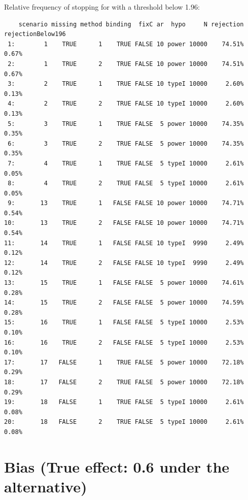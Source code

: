 \documentclass[12pt]{article}
\begin{document}
Relative frequency of stopping for with a threshold below 1.96:
\begin{verbatim}
    scenario missing method binding  fixC ar  hypo     N rejection rejectionBelow196
 1:        1    TRUE      1    TRUE FALSE 10 power 10000    74.51%             0.67%
 2:        1    TRUE      2    TRUE FALSE 10 power 10000    74.51%             0.67%
 3:        2    TRUE      1    TRUE FALSE 10 typeI 10000     2.60%             0.13%
 4:        2    TRUE      2    TRUE FALSE 10 typeI 10000     2.60%             0.13%
 5:        3    TRUE      1    TRUE FALSE  5 power 10000    74.35%             0.35%
 6:        3    TRUE      2    TRUE FALSE  5 power 10000    74.35%             0.35%
 7:        4    TRUE      1    TRUE FALSE  5 typeI 10000     2.61%             0.05%
 8:        4    TRUE      2    TRUE FALSE  5 typeI 10000     2.61%             0.05%
 9:       13    TRUE      1   FALSE FALSE 10 power 10000    74.71%             0.54%
10:       13    TRUE      2   FALSE FALSE 10 power 10000    74.71%             0.54%
11:       14    TRUE      1   FALSE FALSE 10 typeI  9990     2.49%             0.12%
12:       14    TRUE      2   FALSE FALSE 10 typeI  9990     2.49%             0.12%
13:       15    TRUE      1   FALSE FALSE  5 power 10000    74.61%             0.28%
14:       15    TRUE      2   FALSE FALSE  5 power 10000    74.59%             0.28%
15:       16    TRUE      1   FALSE FALSE  5 typeI 10000     2.53%             0.10%
16:       16    TRUE      2   FALSE FALSE  5 typeI 10000     2.53%             0.10%
17:       17   FALSE      1    TRUE FALSE  5 power 10000    72.18%             0.29%
18:       17   FALSE      2    TRUE FALSE  5 power 10000    72.18%             0.29%
19:       18   FALSE      1    TRUE FALSE  5 typeI 10000     2.61%             0.08%
20:       18   FALSE      2    TRUE FALSE  5 typeI 10000     2.61%             0.08%
\end{verbatim}


\clearpage

\section{Bias (True effect: 0.6 under the alternative)}
\label{sec:org8e9efba}
\end{document}
